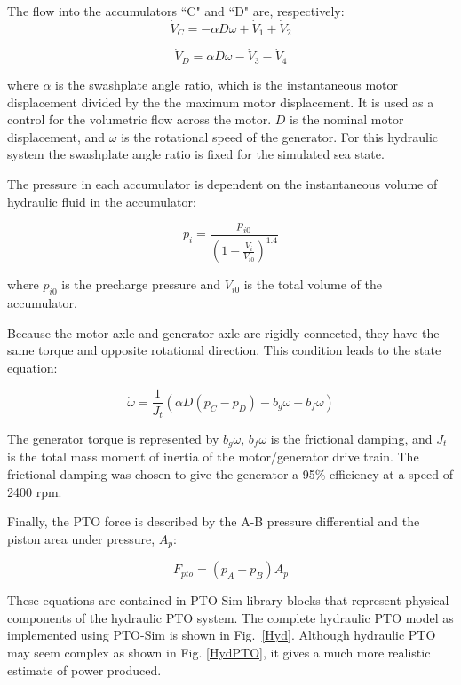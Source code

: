 \documentclass[twocolumn,10pt]{asme2e}
\begin{document}
The flow into the accumulators ``C" and ``D" are, respectively: 
\begin{equation}
\dot{V}_C=-\alpha D \omega+\dot{V}_1+\dot{V}_2 
\end{equation}

\begin{equation}
\dot{V}_D=\alpha D \omega-\dot{V}_3-\dot{V}_4 
\end{equation}

\noindent where $\alpha$ is the swashplate angle ratio, which is the instantaneous motor displacement divided by the the maximum motor displacement. It is used as a control for the volumetric flow across the motor. $D$ is the nominal motor displacement, and $\omega$ is the rotational speed of the generator. 
For this hydraulic system the swashplate angle ratio is fixed for the simulated sea state. 

The pressure in each accumulator is dependent on the instantaneous volume of hydraulic fluid in the accumulator:

\begin{equation}
p_i=\frac{p_{i0}}{(1-\frac{V_i}{V_{i0}})^{1.4}}
\end{equation}

\noindent where $p_{i0}$ is the precharge pressure and $V_{i0}$ is the total volume of the accumulator. 

Because the motor axle and generator axle are rigidly connected, they have the same torque and opposite rotational direction. This condition leads to the state equation:

\begin{equation}
\dot{\omega}=\frac{1}{J_t}(\alpha D (p_C-p_D)-b_g \omega-b_f \omega)
\end{equation}

The generator torque is represented by $b_g$$\omega$, $b_f$$\omega$ is the frictional damping, and $J_t$ is the total mass moment of inertia of the motor/generator drive train.  The frictional damping was chosen to give the generator a 95\% efficiency at a speed of 2400 rpm. 

Finally, the PTO force is described by the A-B pressure differential and the piston area under pressure, $A_p$:

\begin{equation}
F_{pto}=(p_A-p_B)A_p
\end{equation}

These equations are contained in PTO-Sim library blocks that represent physical components of the hydraulic PTO system. The complete hydraulic PTO model as implemented using PTO-Sim is shown in Fig.~\ref{Hyd}. Although hydraulic PTO may seem complex as shown in Fig. \ref{HydPTO}, it gives a much more realistic estimate of power produced. 
\end{document}
